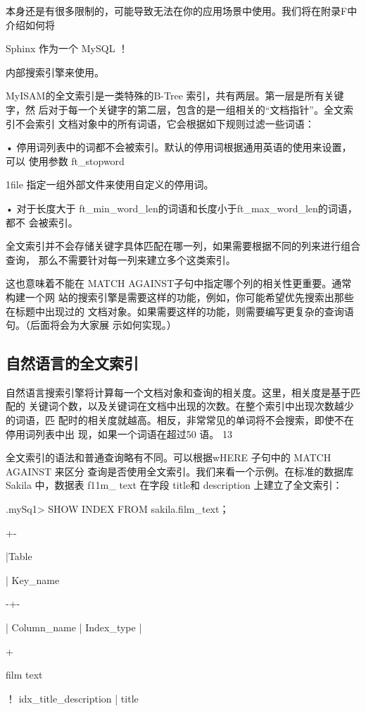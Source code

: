 本身还是有很多限制的，可能导致无法在你的应用场景中使用。我们将在附录F中介绍如何将

Sphinx 作为一个 MySQL ！

内部搜索引擎来使用。

MyISAM的全文索引是一类特殊的B-Tree 索引，共有两层。第一层是所有关键字，然
后对于每一个关键字的第二层，包含的是一组相关的“文档指针”。全文索引不会索引
文档对象中的所有词语，它会根据如下规则过滤一些词语：

• 停用词列表中的词都不会被索引。默认的停用词根据通用英语的使用来设置，可以
使用参数 ft\_stopword

1file 指定一组外部文件来使用自定义的停用词。

• 对于长度大于 ft\_min\_word\_len的词语和长度小于ft\_max\_word\_len的词语，都不
会被索引。

全文索引并不会存储关键字具体匹配在哪一列，如果需要根据不同的列来进行组合查询，
那么不需要针对每一列来建立多个这类索引。

这也意味着不能在 MATCH AGAINST子句中指定哪个列的相关性更重要。通常构建一个网
站的搜索引擎是需要这样的功能，例如，你可能希望优先搜索出那些在标题中出现过的
文档对象。如果需要这样的功能，则需要编写更复杂的查询语句。（后面将会为大家展
示如何实现。）

\subsection{自然语言的全文索引}
自然语言搜索引擎将计算每一个文档对象和查询的相关度。这里，相关度是基于匹配的
关键词个数，以及关键词在文档中出现的次数。在整个索引中出现次数越少的词语，匹
配时的相关度就越高。相反，非常常见的单词将不会搜索，即使不在停用词列表中出
现，如果一个词语在超过50%
语。 13

全文索引的语法和普通查询略有不同。可以根据wHERE 子句中的 MATCH AGAINST 来区分
查询是否使用全文索引。我们来看一个示例。在标准的数据库Sakila 中，数据表 f11m\_
text 在字段 title和 description 上建立了全文索引：

.mySq1> SHOW INDEX FROM sakila.film\_text；

+-

|Table

| Key\_name

-+-

| Column\_name | Index\_type |

+

film text

！ idx\_title\_description | title

